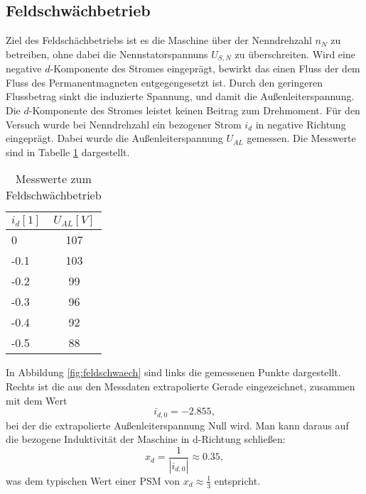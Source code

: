 \clearpage 

\subsection{Feldschwächbetrieb} 
Ziel des Feldschächbetriebs ist es die Maschine über der Nenndrehzahl $n_N$ zu betreiben, ohne dabei die Nennstatorspannuns $U_{S,N}$ zu überschreiten. Wird eine negative $d$-Komponente des Stromes eingeprägt, bewirkt das einen Fluss der dem Fluss des Permanentmagneten entgegengesetzt ist. Durch den geringeren Flussbetrag sinkt die induzierte Spannung, und damit die Außenleiterspannung. Die $d$-Komponente des Stromes leistet keinen Beitrag zum Drehmoment. Für den Versuch wurde bei Nenndrehzahl ein bezogener Strom $i_d$ in negative Richtung eingeprägt. Dabei wurde die Außenleiterspannung $U_{AL}$ gemessen. Die Messwerte sind in Tabelle \ref{tab:PSM_feldschwaech} dargestellt.

\begin{table}[!ht]
\centering%
    \begin{tabular}{|l|c|}
    \hline
    $i_d [1]$ & $U_{AL} [V]$ \\ \hline
    0         & 107          \\ \hline
    -0.1      & 103          \\ \hline
    -0.2      & 99           \\ \hline
    -0.3      & 96           \\ \hline
    -0.4      & 92           \\ \hline
    -0.5      & 88           \\ \hline
    \end{tabular}
    \caption{Messwerte zum Feldschwächbetrieb}
    \label{tab:PSM_feldschwaech}
\end{table}
\noindent In Abbildung \ref{fig:feldschwaech} sind links die gemessenen Punkte dargestellt. Rechts ist die aus den Messdaten extrapolierte Gerade eingezeichnet, zusammen mit dem Wert
\begin{equation*}
    i_{d,0} = -2.855,
\end{equation*}
bei der die extrapolierte Außenleiterspannung Null wird. Man kann daraus auf die bezogene Induktivität der Maschine in d-Richtung schließen:
\begin{equation*}
    x_d = \frac{1}{|i_{d,0}|} \approx 0.35,
\end{equation*}
was dem typischen Wert einer PSM von $x_d \approx \frac{1}{3}$ entspricht.
